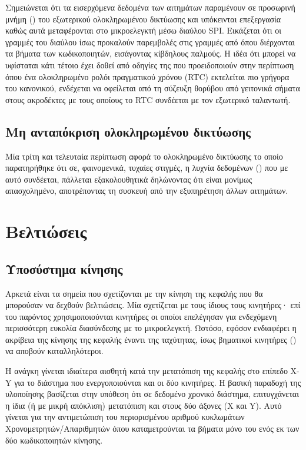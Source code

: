 Σημειώνεται ότι τα εισερχόμενα δεδομένα των αιτημάτων παραμένουν σε προσωρινή
μνήμη () του εξωτερικού ολοκληρωμένου δικτύωσης και υπόκεινται
επεξεργασία καθώς αυτά μεταφέρονται στο μικροελεγκτή μέσω διαύλου SPI. Εικάζεται
ότι οι γραμμές του διαύλου ίσως προκαλούν παρεμβολές στις γραμμές από όπου
διέρχονται τα βήματα των κωδικοποιητών, εισάγοντας κίβδηλους παλμούς. Η ιδέα ότι
μπορεί να υφίσταται κάτι τέτοιο έχει δοθεί από οδηγίες της
\textcite[7]{maxim:xtal} που προειδοποιούν στην περίπτωση όπου ένα
ολοκληρωμένο ρολόι πραγματικού χρόνου (RTC) εκτελείται πιο γρήγορα του
κανονικού, ενδέχεται να οφείλεται από τη σύζευξη θορύβου από γειτονικά σήματα
στους ακροδέκτες με τους οποίους το RTC συνδέεται με τον εξωτερικό ταλαντωτή.


\subsection*{Μη ανταπόκριση ολοκληρωμένου δικτύωσης}

Μία τρίτη και τελευταία περίπτωση αφορά το ολοκληρωμένο δικτύωσης το οποίο
παρατηρήθηκε ότι σε, φαινομενικά, τυχαίες στιγμές, η λυχνία δεδομένων
() που με αυτό συνδέεται, πάλλεται εξακολουθητικά δηλώνοντας ότι
είναι μονίμως απασχολημένο, αποτρέποντας τη συσκευή από την εξυπηρέτηση άλλων
αιτημάτων.


\section{Βελτιώσεις}
\label{sec:improvements}

\subsection*{Υποσύστημα κίνησης}

Αρκετά είναι τα σημεία που σχετίζονται με την κίνηση της κεφαλής που θα
μπορούσαν να δεχθούν βελτιώσεις. Μία σχετίζεται με τους ίδιους τους κινητήρες·
επί του παρόντος χρησιμοποιούνται κινητήρες  οι οποίοι επελέγησαν για
ενδεχόμενη περισσότερη ευκολία διασύνδεσης με το μικροελεγκτή. Ωστόσο, εφόσον
ενδιαφέρει η ακρίβεια της κίνησης της κεφαλής έναντι της ταχύτητας, ίσως
βηματικοί κινητήρες () να αποβούν καταλληλότεροι.

Η ανάγκη γίνεται ιδιαίτερα αισθητή κατά την μετατόπιση της κεφαλής στο επίπεδο
X-Y για το διάστημα που ενεργοποιούνται και οι δύο κινητήρες. Η βασική παραδοχή
της υλοποίησης βασίζεται στην υπόθεση ότι σε δεδομένο χρονικό διάστημα,
επιτυγχάνεται η ίδια (ή με μικρή απόκλιση) μετατόπιση και στους δύο άξονες (X
και Y). Αυτό γίνεται για την αντιμετώπιση του περιορισμένου αριθμού κυκλωμάτων
Χρονομετρητών\slash{}Απαριθμητών όπου καταμετρούνται τα βήματα μόνο του ενός εκ
των δύο κωδικοποιητών κίνησης. 

